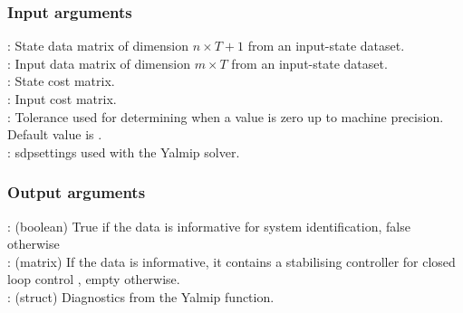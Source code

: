 \subsubsection*{Input arguments}
\textbf{}: State data matrix of dimension $n \times T+1$ from an input-state dataset.\\
\textbf{}: Input data matrix of dimension $m \times T$ from an input-state dataset.\\
\textbf{}: State cost matrix.\\
\textbf{}: Input cost matrix.\\
\textbf{}: Tolerance used for determining when a value is zero up to machine precision. Default value is .\\
\textbf{}: sdpsettings used with the Yalmip solver.

\subsubsection*{Output arguments}
\textbf{}: (boolean) True if the data is informative for system identification, false otherwise\\
\textbf{}: (matrix) If the data is informative, it contains a stabilising controller  for closed loop control , empty otherwise.\\
\textbf{}: (struct) Diagnostics from the Yalmip  function.


